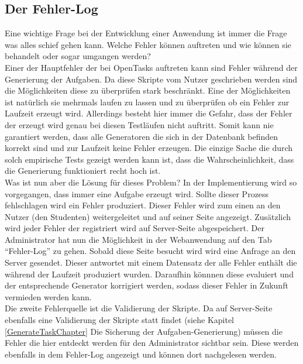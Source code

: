 \begin{enumerate}
\subsection{Der Fehler-Log}

Eine wichtige Frage bei der Entwicklung einer Anwendung ist immer die Frage was alles schief gehen kann. Welche Fehler können auftreten und wie können sie behandelt oder sogar umgangen werden? \\
Einer der Hauptfehler der bei OpenTasks auftreten kann sind Fehler während der Generierung der Aufgaben. Da diese Skripte vom Nutzer geschrieben werden sind die Möglichkeiten diese zu überprüfen stark beschränkt. Eine der Möglichkeiten ist natürlich sie mehrmals laufen zu lassen und zu überprüfen ob ein Fehler zur Laufzeit erzeugt wird. Allerdings besteht hier immer die Gefahr, dass der Fehler der erzeugt wird genau bei diesen Testläufen nicht auftritt. Somit kann nie garantiert werden, dass alle Generatoren die sich in der Datenbank befinden korrekt sind und zur Laufzeit keine Fehler erzeugen. Die einzige Sache die durch solch empirische Tests gezeigt werden kann ist, dass die Wahrscheinlichkeit, dass die Generierung funktioniert recht hoch ist. \\

Was ist nun aber die Lösung für dieses Problem? In der Implementierung wird so vorgegangen, dass immer eine Aufgabe erzeugt wird. Sollte dieser Prozess fehlschlagen wird ein Fehler produziert. Dieser Fehler wird zum einen an den Nutzer (den Studenten) weitergeleitet und auf seiner Seite angezeigt. Zusätzlich wird jeder Fehler der registriert wird auf Server-Seite abgespeichert. Der Administrator hat nun die Möglichkeit in der Webanwendung auf den Tab ``Fehler-Log'' zu gehen. Sobald diese Seite besucht wird wird eine Anfrage an den Server gesendet. Dieser antwortet mit einem Datensatz der alle Fehler enthält die während der Laufzeit produziert wurden. Daraufhin könnnen diese evaluiert und der entsprechende Generator korrigiert werden, sodass dieser Fehler in Zukunft vermieden werden kann. \\

Die zweite Fehlerquelle ist die Validierung der Skripte. Da auf Server-Seite ebenfalls eine Validierung der Skripte statt findet (siehe Kapitel \ref{GenerateTaskChapter} Die Sicherung der Aufgaben-Generierung) müssen die Fehler die hier entdeckt werden für den Administrator sichtbar sein. Diese werden ebenfalls in dem Fehler-Log angezeigt und können dort nachgelesen werden.


\end{enumerate}
